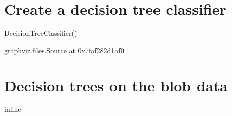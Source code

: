 \documentclass[letterpaper,10pt,english]{sphinxmanual}
\begin{document}
\section{Create a decision tree classifier}
\label{\detokenize{05-SupervisedSegmentation:create-a-decision-tree-classifier}}
\begin{sphinxVerbatim}[commandchars=\\\{\}]
  
\PYG{p}{[}   \PYG{p}{]}  
           \PYG{p}{[}   \PYG{p}{]}
\end{sphinxVerbatim}

\begin{sphinxVerbatim}[commandchars=\\\{\}]
DecisionTreeClassifier()
\end{sphinxVerbatim}

\begin{sphinxVerbatim}[commandchars=\\\{\}]
\end{sphinxVerbatim}

\begin{sphinxVerbatim}[commandchars=\\\{\}]
\PYGZlt{}graphviz.files.Source at 0x7faf282d1af0\PYGZgt{}
\end{sphinxVerbatim}


\section{Decision trees on the blob data}
\label{\detokenize{05-SupervisedSegmentation:decision-trees-on-the-blob-data}}
\begin{sphinxVerbatim}[commandchars=\\\{\}]
   
   
   
   
 inline
\end{sphinxVerbatim}
\end{document}
